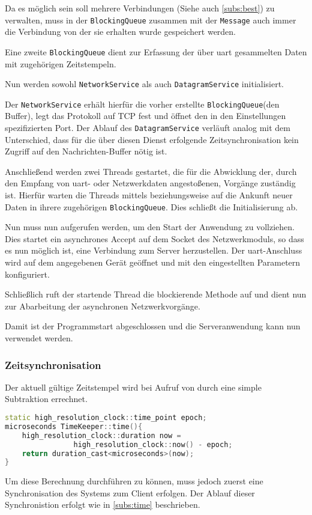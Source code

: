 Da es möglich sein soll mehrere Verbindungen (Siehe auch \autoref{subs:best}) zu
verwalten, muss in der \texttt{BlockingQueue} zusammen mit der \texttt{Message}
auch immer die Verbindung von der sie erhalten wurde gespeichert werden.

Eine zweite \texttt{BlockingQueue} dient zur Erfassung der über \gls{uart}
gesammelten Daten mit zugehörigen Zeitstempeln. 

Nun werden sowohl \texttt{NetworkService} als auch \texttt{DatagramService}
initialisiert.

Der \texttt{NetworkService} erhält hierfür die vorher erstellte
\texttt{BlockingQueue}(den Buffer), legt das Protokoll auf TCP fest und
öffnet den in den Einstellungen spezifizierten Port. Der Ablauf des
\texttt{DatagramService} verläuft analog mit dem Unterschied, dass für die über
diesen Dienst erfolgende Zeitsynchronisation kein Zugriff auf den
Nachrichten-Buffer nötig ist.

Anschließend werden zwei Threads gestartet, die für die Abwicklung der, durch
den Empfang von \gls{uart}- oder Netzwerkdaten angestoßenen, Vorgänge
zuständig ist. Hierfür warten die Threads mittels  beziehungsweise \newline{} auf die Ankunft neuer Daten in ihrere zugehörigen
\texttt{BlockingQueue}. Dies schließt die Initialisierung ab.

Nun muss nun  aufgerufen werden, um den Start der
Anwendung zu vollziehen. Dies startet ein asynchrones Accept auf dem Socket des
Netzwerkmoduls, so dass es nun möglich ist, eine Verbindung zum Server
herzustellen. Der \gls{uart}-Anschluss wird auf dem angegebenen Gerät geöffnet
und mit den eingestellten Parametern konfiguriert.

Schließlich ruft der startende Thread die blockierende Methode
 auf und dient nun zur Abarbeitung der
asynchronen Netzwerkvorgänge.

Damit ist der Programmstart abgeschlossen und die Serveranwendung kann nun
verwendet werden.
\subsubsection*{Zeitsynchronisation}
Der aktuell gültige Zeitstempel wird bei Aufruf von
 durch eine simple Subtraktion errechnet.
\begin{lstlisting}[language=C++]
static high_resolution_clock::time_point epoch;
microseconds TimeKeeper::time(){
    high_resolution_clock::duration now = 
    			high_resolution_clock::now() - epoch;
    return duration_cast<microseconds>(now);
}
\end{lstlisting}
Um diese Berechnung durchführen zu können, muss jedoch zuerst eine
Synchronisation des Systems zum Client erfolgen. Der Ablauf dieser
Synchronistion erfolgt wie in \autoref{subs:time} beschrieben.

